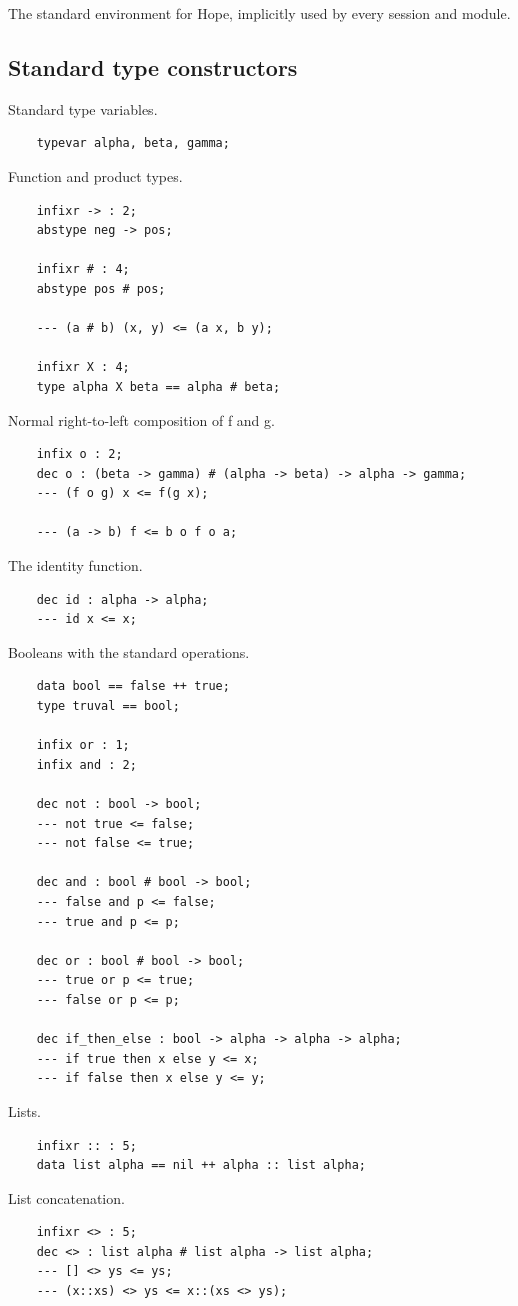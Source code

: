 The standard environment for Hope, implicitly used by every session
and module.
\subsection{Standard type constructors}

Standard type variables.
\begin{verbatim}
    typevar alpha, beta, gamma;
\end{verbatim}
Function and product types.
\begin{verbatim}
    infixr -> : 2;
    abstype neg -> pos;

    infixr # : 4;
    abstype pos # pos;

    --- (a # b) (x, y) <= (a x, b y);

    infixr X : 4;
    type alpha X beta == alpha # beta;
\end{verbatim}
Normal right-to-left composition of f and g.
\begin{verbatim}
    infix o : 2;
    dec o : (beta -> gamma) # (alpha -> beta) -> alpha -> gamma;
    --- (f o g) x <= f(g x);

    --- (a -> b) f <= b o f o a;
\end{verbatim}
The identity function.
\begin{verbatim}
    dec id : alpha -> alpha;
    --- id x <= x;
\end{verbatim}
Booleans with the standard operations.
\begin{verbatim}
    data bool == false ++ true;
    type truval == bool;

    infix or : 1;
    infix and : 2;

    dec not : bool -> bool;
    --- not true <= false;
    --- not false <= true;

    dec and : bool # bool -> bool;
    --- false and p <= false;
    --- true and p <= p;

    dec or : bool # bool -> bool;
    --- true or p <= true;
    --- false or p <= p;

    dec if_then_else : bool -> alpha -> alpha -> alpha;
    --- if true then x else y <= x;
    --- if false then x else y <= y;
\end{verbatim}
Lists.
\begin{verbatim}
    infixr :: : 5;
    data list alpha == nil ++ alpha :: list alpha;
\end{verbatim}
List concatenation.
\begin{verbatim}
    infixr <> : 5;
    dec <> : list alpha # list alpha -> list alpha;
    --- [] <> ys <= ys;
    --- (x::xs) <> ys <= x::(xs <> ys);
\end{verbatim}
